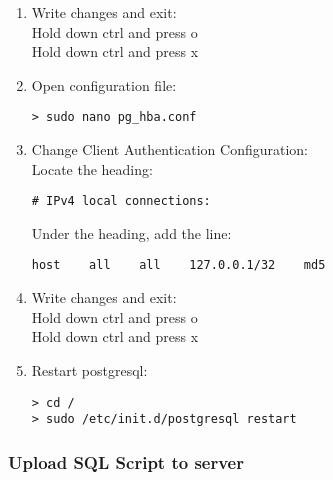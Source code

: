 \begin{enumerate}
      \item Write changes and exit:\\
      Hold down ctrl and press o\\
      Hold down ctrl and press x

      \item Open configuration file:
      \begin{verbatim}
> sudo nano pg_hba.conf
      \end{verbatim}

      \item Change Client Authentication Configuration:\\Locate the heading: 
      \begin{verbatim}
# IPv4 local connections:
      \end{verbatim}
      Under the heading, add the line:
      \begin{verbatim}
host    all    all    127.0.0.1/32    md5
      \end{verbatim}

      \item Write changes and exit:\\
      Hold down ctrl and press o\\
      Hold down ctrl and press x

      \item Restart postgresql:
      \begin{verbatim}
> cd /
> sudo /etc/init.d/postgresql restart
      \end{verbatim}

    \end{enumerate}

    \subsubsection{Upload SQL Script to server}

